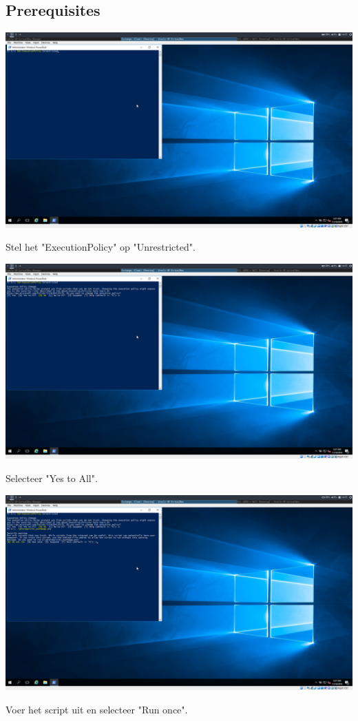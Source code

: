 \documentclass[a4paper]{article}
\begin{document}
\subsection{Prerequisites}
	\begin{center}
	\includegraphics[width=15cm]{Pictures/Exchange/Pre/1542632844.png}
	
	Stel het "ExecutionPolicy" op "Unrestricted".
\end{center}
	\begin{center}
	\includegraphics[width=15cm]{Pictures/Exchange/Pre/1542632849.png}
	
	Selecteer "Yes to All".
\end{center}
	\begin{center}
	\includegraphics[width=15cm]{Pictures/Exchange/Pre/1542632856.png}
	
	Voer het script uit en selecteer "Run once".
\end{center}
\end{document}
